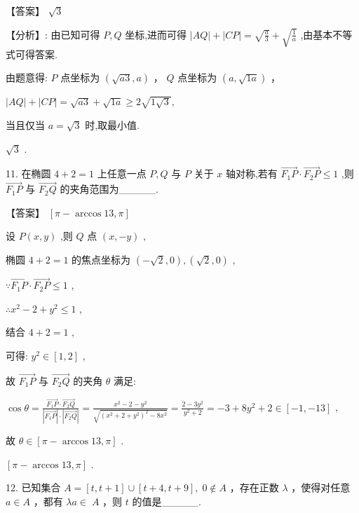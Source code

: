 \documentclass[10pt]{article}
\begin{document}
【答案】 \(\sqrt{3}\)

【分析】: 由已知可得 \(P,Q\) 坐标,进而可得 \(\left| {AQ}\right|  + \left| {CP}\right|  = \sqrt{\frac{a}{3}} + \sqrt{\frac{1}{a}}\) ,由基本不等式可得答案.

由题意得: \(P\) 点坐标为 \(\left( {\sqrt{a3},a}\right)\) ， \(Q\) 点坐标为 \(\left( {a,\sqrt{1a}}\right)\) ，

\(\left| {AQ}\right|  + \left| {CP}\right|  = \sqrt{a3} + \sqrt{1a} \geq  2\sqrt{1\sqrt{3}},\)

当且仅当 \(a = \sqrt{3}\) 时,取最小值.

\(\sqrt{3}\) .

11. 在椭圆 \(4 + 2 = 1\) 上任意一点 \(P,Q\) 与 \(P\) 关于 \(x\) 轴对称,若有 \(\overrightarrow{{F}_{1}P} \cdot  \overrightarrow{{F}_{2}P} \leq  1\) ,则 \(\overrightarrow{{F}_{1}P}\) 与 \(\overrightarrow{{F}_{2}Q}\) 的夹角范围为\_\_\_\_\_.

【答案】 \(\left\lbrack  {\pi  - \arccos {13},\pi }\right\rbrack\)

设 \(P\left( {x,y}\right)\) ,则 \(Q\) 点 \(\left( {x, - y}\right)\) ,

椭圆 \(4 + 2 = 1\) 的焦点坐标为 \(\left( {-\sqrt{2},0}\right) ,\left( {\sqrt{2},0}\right)\) ,

\(\because \overrightarrow{{F}_{1}P} \cdot  \overrightarrow{{F}_{2}P} \leq  1\) ,

\(\therefore {x}^{2} - 2 + {y}^{2} \leq  1\) ,

结合 \(4 + 2 = 1\) ,

可得: \({y}^{2} \in  \left\lbrack  {1,2}\right\rbrack\) ,

故 \(\overrightarrow{{F}_{1}P}\) 与 \(\overrightarrow{{F}_{2}Q}\) 的夹角 \(\theta\) 满足:

\(\cos \theta  = \frac{\overrightarrow{{F}_{1}P} \cdot  \overrightarrow{{F}_{2}Q}}{\left| \overrightarrow{{F}_{1}P}\right|  \cdot  \left| \overrightarrow{{F}_{2}Q}\right| } = \frac{{x}^{2} - 2 - {y}^{2}}{\sqrt{{\left( {x}^{2} + 2 + {y}^{2}\right) }^{2} - 8{x}^{2}}} = \frac{2 - 3{y}^{2}}{{y}^{2} + 2} =  - 3 + 8{y}^{2} + 2 \in  \left\lbrack  {-1, - {13}}\right\rbrack\) ,

故 \(\theta  \in  \left\lbrack  {\pi  - \arccos {13},\pi }\right\rbrack\) .

\(\left\lbrack  {\pi  - \arccos {13},\pi }\right\rbrack\) .

12. 已知集合 \(A = \left\lbrack  {t,t + 1}\right\rbrack   \cup  \left\lbrack  {t + 4,t + 9}\right\rbrack  ,\;0 \notin  A\) ，存在正数 \(\lambda\) ，使得对任意 \(a \in  A\) ，都有 \({\lambda a} \in \; A\) ，则 \(t\) 的值是\_\_\_\_\_.
\end{document}
